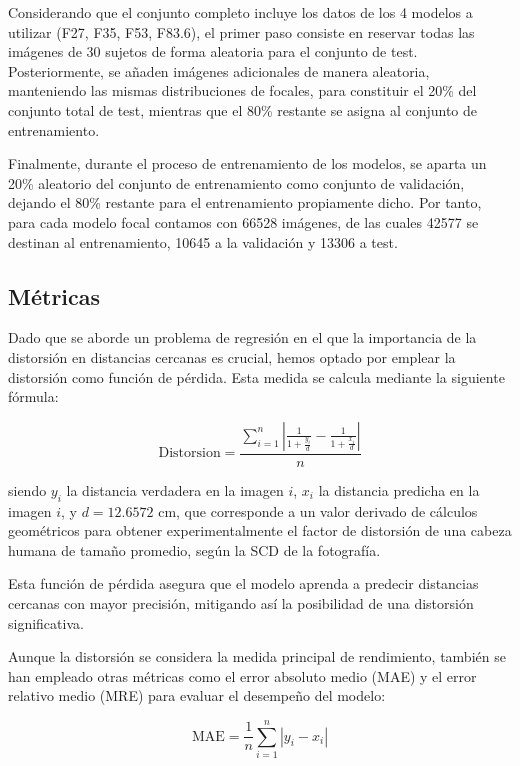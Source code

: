 Considerando que el conjunto completo incluye los datos de los 4 modelos a utilizar (F27, F35, F53, F83.6), el primer paso consiste en reservar todas las imágenes de 30 sujetos de forma aleatoria para el conjunto de test. Posteriormente, se añaden imágenes adicionales de manera aleatoria, manteniendo las mismas distribuciones de focales, para constituir el 20\% del conjunto total de test, mientras que el 80\% restante se asigna al conjunto de entrenamiento.

Finalmente, durante el proceso de entrenamiento de los modelos, se aparta un 20\% aleatorio del conjunto de entrenamiento como conjunto de validación, dejando el 80\% restante para el entrenamiento propiamente dicho. Por tanto, para cada modelo focal contamos con 66528 imágenes, de las cuales 42577 se destinan al entrenamiento, 10645 a la validación y 13306 a test.

\subsection{Métricas}

Dado que se aborde un problema de regresión en el que la importancia de la distorsión en distancias cercanas es crucial, hemos optado por emplear la distorsión como función de pérdida. Esta medida se calcula mediante la siguiente fórmula:

\begin{equation}
	\text{Distorsion} = \displaystyle \frac{\sum_{i=1}^{n} | \displaystyle \frac{1}{1 + \displaystyle \frac{y_i}{d}} - \displaystyle \frac{1}{1 + \displaystyle \frac{x_i}{d}}|}{n}
\end{equation}

siendo $y_i$ la distancia verdadera en la imagen $i$, $x_i$ la distancia predicha en la imagen $i$, y $d = 12.6572 $ cm, que corresponde a un valor derivado de cálculos geométricos \cite{55} para obtener experimentalmente el factor de distorsión de una cabeza humana de tamaño promedio, según la SCD de la fotografía.

Esta función de pérdida asegura que el modelo aprenda a predecir distancias cercanas con mayor precisión, mitigando así la posibilidad de una distorsión significativa.

Aunque la distorsión se considera la medida principal de rendimiento, también se han empleado otras métricas como el error absoluto medio (MAE) y el error relativo medio (MRE) para evaluar el desempeño del modelo:

\begin{equation}
	\text{MAE} = \frac{1}{n} \sum_{i=1}^{n} | y_i - x_i |
\end{equation}


